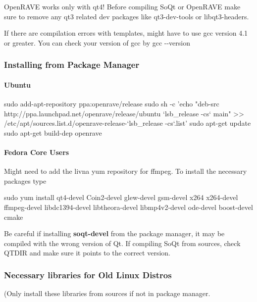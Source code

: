OpenRAVE works only with qt4! Before compiling SoQt or OpenRAVE make sure to remove any qt3 related dev packages like {\ttfamily qt3-\/dev-\/tools} or {\ttfamily libqt3-\/headers}.

If there are compilation errors with templates, might have to use gcc version 4.1 or greater. You can check your version of gcc by {\ttfamily gcc -\/-\/version}\hypertarget{installation__linux_ilinux_package}{}\subsubsection{Installing from Package Manager}\label{installation__linux_ilinux_package}
\hypertarget{installation__linux_ilinux_ubuntu}{}\paragraph{Ubuntu}\label{installation__linux_ilinux_ubuntu}
\begin{DoxyVerb}
sudo add-apt-repository ppa:openrave/release
sudo sh -c 'echo "deb-src http://ppa.launchpad.net/openrave/release/ubuntu `lsb_release -cs` main" >> /etc/apt/sources.list.d/openrave-release-`lsb_release -cs`.list'
sudo apt-get update
sudo apt-get build-dep openrave
\end{DoxyVerb}
\hypertarget{installation__linux_ilinux_fedora}{}\paragraph{Fedora Core Users}\label{installation__linux_ilinux_fedora}
Might need to add the livna yum repository for ffmpeg. To install the necessary packages type

\begin{DoxyVerb}
sudo yum install qt4-devel Coin2-devel glew-devel gsm-devel x264 x264-devel ffmpeg-devel libdc1394-devel libtheora-devel libmp4v2-devel ode-devel boost-devel cmake
\end{DoxyVerb}


Be careful if installing {\bfseries soqt-\/devel} from the package manager, it may be compiled with the wrong version of Qt. If compiling SoQt from sources, check {\ttfamily QTDIR} and make sure it points to the correct version.\hypertarget{installation__linux_ilinux_libraries}{}\subsubsection{Necessary libraries for Old Linux Distros}\label{installation__linux_ilinux_libraries}
(Only install these libraries from sources if not in package manager.


